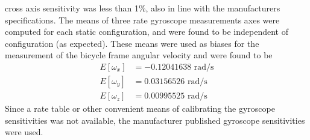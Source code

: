 cross axis sensitivity was less than 1\%, also in line with the manufacturers
specifications. The means of three rate gyroscope measurements axes were
computed for each static configuration, and were found to be independent of
configuration (as expected). These means were used as biases for the
measurement of the bicycle frame angular velocity and were found to be
\begin{align}
  E[\omega_x] &= -0.12041638 \text{ rad/s}\\
  E[\omega_y] &= 0.03156526 \text{ rad/s}\\
  E[\omega_z] &= 0.00995525 \text{ rad/s}
\end{align}
Since a rate table or other convenient means of calibrating the gyroscope
sensitivities was not available, the manufacturer published gyroscope
sensitivities were used.











%


